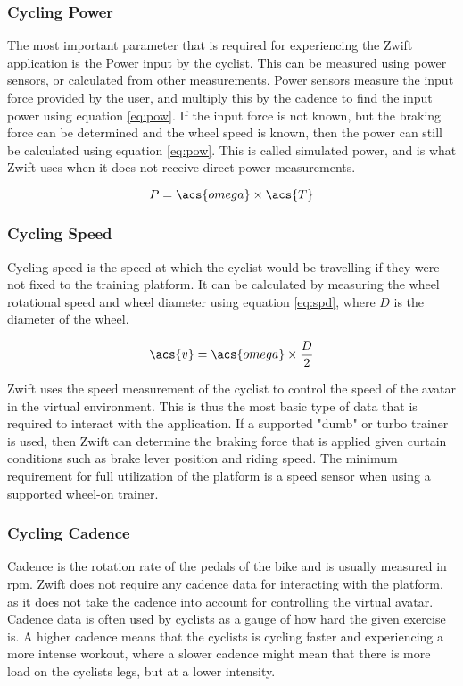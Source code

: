\subsubsection{Cycling Power}
The most important parameter that is required for experiencing the Zwift application is the Power input by the cyclist. This can be measured using power sensors, or calculated from other measurements. Power sensors measure the input force provided by the user, and multiply this by the cadence to find the input power using equation \ref{eq:pow}. If the input force is not known, but the braking force can be determined and the wheel speed is known, then the power can still be calculated using equation \ref{eq:pow}. This is called simulated power, and is what Zwift uses when it does not receive direct power measurements.

\begin{equation}
	P = \acs{omega} \times \acs{T}
	\label{eq:pow}
\end{equation}

\subsubsection{Cycling Speed}
Cycling speed is the speed at which the cyclist would be travelling if they were not fixed to the training platform. It can be calculated by measuring the wheel rotational speed and wheel diameter using equation \ref{eq:spd}, where $D$ is the diameter of the wheel.

\begin{equation}
	\acs{v} = \acs{omega} \times \frac{D}{2}
	\label{eq:spd}
\end{equation}

Zwift uses the speed measurement of the cyclist to control the speed of the avatar in the virtual environment. This is thus the most basic type of data that is required to interact with the application. If a supported "dumb" or turbo trainer is used, then Zwift can determine the braking force that is applied given curtain conditions such as brake lever position and riding speed.
The minimum requirement for full utilization of the platform is a speed sensor when using a supported wheel-on trainer.

\subsubsection{Cycling Cadence}
Cadence is the rotation rate of the pedals of the bike and is usually measured in \ac{rpm}. Zwift does not require any cadence data for interacting with the platform, as it does not take the cadence into account for controlling the virtual avatar. Cadence data is often used by cyclists as a gauge of how hard the given exercise is. A higher cadence means that the cyclists is cycling faster and experiencing a more intense workout, where a slower cadence might mean that there is more load on the cyclists legs, but at a lower intensity.
\newpage

